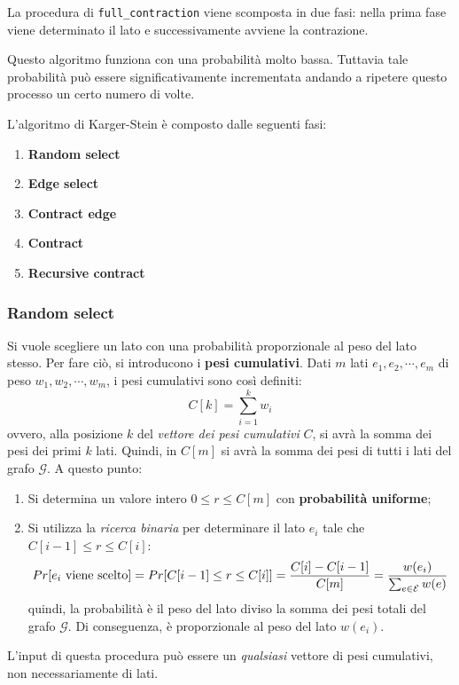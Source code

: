La procedura di \verb|full_contraction| viene scomposta in due fasi: 
nella prima fase viene determinato il lato e successivamente avviene la 
contrazione.

Questo algoritmo funziona con una probabilità molto bassa. Tuttavia tale probabilità 
può essere significativamente incrementata andando a ripetere questo processo un certo 
numero di volte.

L'algoritmo di Karger-Stein è composto dalle seguenti fasi:
\begin{enumerate}
    \item \textbf{Random select}
    \item \textbf{Edge select}
    \item \textbf{Contract edge}
    \item \textbf{Contract}
    \item \textbf{Recursive contract}
\end{enumerate}

\subsubsection*{Random select}
Si vuole scegliere un lato con una probabilità 
proporzionale al peso del lato stesso. Per fare ciò, si introducono i 
\textbf{pesi cumulativi}. Dati $m$ lati $e_1, e_2, \cdots , e_m$ di peso 
$w_1, w_2, \cdots , w_m$, i pesi cumulativi sono così definiti:
\[
    C[k] = \sum_{i = 1}^{k} w_i
\]
ovvero, alla posizione $k$ del \textit{vettore dei pesi cumulativi} $C$, si avrà 
la somma dei pesi dei primi $k$ lati. Quindi, in $C[m]$ si avrà la somma dei pesi 
di tutti i lati del grafo $\mathcal{G}$. A questo punto:
\begin{enumerate}
    \item Si determina un valore intero $0 \le r \le C[m]$ con 
    \textbf{probabilità uniforme};
    \item \label{scelta_lato} Si utilizza la \textit{ricerca binaria} per 
    determinare il lato $e_i$ tale che $C[i - 1] \le r \le C[i]$:
    \[
        Pr[e_i \textnormal{ viene scelto}] = Pr[C[i - 1] \le r \le C[i]] = \frac{C[i] - C[i - 1]}{C[m]} = \frac{w(e_i)}{\sum_{e \in \mathcal{E}} w(e)}
    \]
    quindi, la probabilità è il peso del lato diviso la somma dei pesi totali del 
    grafo $\mathcal{G}$. Di conseguenza, è proporzionale al peso del lato $w(e_i)$.
\end{enumerate}
L'input di questa procedura può essere un \textit{qualsiasi} vettore di pesi 
cumulativi, non necessariamente di lati.

